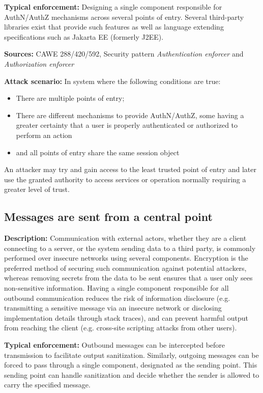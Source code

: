  \textbf{Typical enforcement:} Designing a single component responsible for AuthN/AuthZ mechanisms across several points of entry. Several third-party libraries exist that provide such features as well as language extending specifications such as Jakarta EE (formerly J2EE). 
 
 \textbf{Sources:} CAWE 288/420/592, Security pattern \textit{Authentication enforcer} and \textit{Authorization enforcer}
 
 \textbf{Attack scenario:} In system where the following conditions are true:
 
 \begin{itemize}
     \item There are multiple points of entry; 
     \item There are different mechanisms to provide AuthN/AuthZ, some having a greater certainty that a user is properly authenticated or authorized to perform an action
     \item and all points of entry share the same session object
 \end{itemize}
 
  An attacker may try and gain access to the least trusted point of entry and later use the granted authority to access services or operation normally requiring a greater level of trust.

\subsection{Messages are sent from a central point} 

\textbf{Description:} 
Communication with external actors, whether they are a client connecting to a server, or the system sending data to a third party, is commonly performed over insecure networks using several components. Encryption is the preferred method of securing such communication against potential attackers, whereas removing secrets from the data to be sent ensures that a user only sees non-sensitive information. Having a single component responsible for all outbound communication reduces the risk of information disclosure (e.g. transmitting a sensitive message via an insecure network or disclosing implementation details through stack traces), and can prevent harmful output from reaching the client (e.g. cross-site scripting attacks from other users). 
 
 \textbf{Typical enforcement:} 
 Outbound messages can be intercepted before transmission to facilitate output sanitization. Similarly, outgoing messages can be forced to pass through a single component, designated as the sending point. This sending point can handle sanitization and decide whether the sender is allowed to carry the specified message.
 
